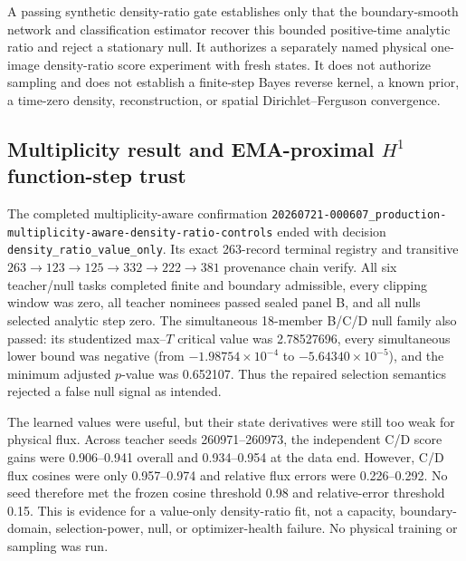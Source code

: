 \documentclass[11pt]{article}
\numberwithin{equation}{section}
\newcommand{\1}{\mathbf 1}
\begin{document}
A passing synthetic density-ratio gate establishes only that the
boundary-smooth network and classification estimator recover this bounded
positive-time analytic ratio and reject a stationary null.  It authorizes a
separately named physical one-image density-ratio score experiment with fresh
states.  It does not authorize sampling and does not establish a finite-step
Bayes reverse kernel, a known prior, a time-zero density, reconstruction, or
spatial Dirichlet--Ferguson convergence.

\subsection{Multiplicity result and EMA-proximal \texorpdfstring{$H^1$}{H1} function-step trust}
\label{sec:density-ratio-h1-trust}

The completed multiplicity-aware confirmation
\nolinkurl{20260721-000607_production-multiplicity-aware-density-ratio-controls}
ended with decision \nolinkurl{density_ratio_value_only}.  Its exact
263-record terminal registry and transitive
\(263\mathbin{\to}123\mathbin{\to}125\mathbin{\to}332\mathbin{\to}
222\mathbin{\to}381\) provenance chain verify.  All six teacher/null tasks
completed finite and boundary admissible, every clipping window was zero,
all teacher nominees passed sealed panel B, and all nulls selected analytic
step zero.  The simultaneous 18-member B/C/D null family also passed: its
studentized max--\(T\) critical value was 2.78527696, every simultaneous
lower bound was negative (from
\(-1.98754\mathbin{\times}10^{-4}\) to
\(-5.64340\mathbin{\times}10^{-5}\)), and the minimum adjusted \(p\)-value
was 0.652107.  Thus the repaired selection semantics rejected a false null
signal as intended.

The learned values were useful, but their state derivatives were still too
weak for physical flux.  Across teacher seeds 260971--260973, the independent
C/D score gains were 0.906--0.941 overall and 0.934--0.954 at the data end.
However, C/D flux cosines were only 0.957--0.974 and relative flux errors
were 0.226--0.292.  No seed therefore met the frozen cosine threshold 0.98
and relative-error threshold 0.15.  This is evidence for a value-only
density-ratio fit, not a capacity, boundary-domain, selection-power, null,
or optimizer-health failure.  No physical training or sampling was run.
\end{document}
